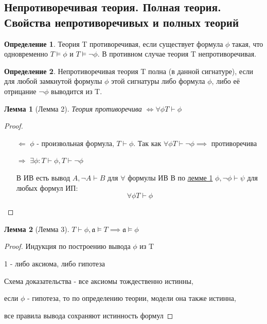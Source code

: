 \documentclass[a4paper]{article}
\newtheorem{lemma}{Лемма}[section]
\theoremstyle{definition}
\newtheorem*{definition}{Определение}
\theoremstyle{remark}
\begin{document}
    \subsection{Непротиворечивая теория. Полная теория. Свойства непротиворечивых и полных теорий}
    \begin{definition}
        Теория T противоречивая, если существует формула $\phi$ такая, что одновременно 
    $T \models \phi$ и $T \models \neg\phi$. В противном случае теория T непротиворечивая.
    \end{definition}
    \begin{definition}
        Непротиворечивая теория T полна (в данной сигнатуре), если для любой замкнутой формулы 
        $\phi$ этой сигнатуры либо формула $\phi$, либо её отрицание ¬$\phi$ выводится из T.
    \end{definition}
    \begin{lemma}[\hypertarget{Лемма 2}{Лемма 2}]
        Теория противоречива $\Leftrightarrow \forall \phi T\vdash \phi$
    \end{lemma}
    \begin{proof}
        \begin{itemize}
            \item[$\Leftarrow$] $\phi$ - произвольная формула, $T\vdash \phi$. Так как $\forall \phi T\vdash \neg \phi\implies$ противоречива
            \item[$\Rightarrow$] $\exists \phi: T\vdash\phi, T\vdash \neg \phi$
            
            В ИВ есть вывод $A, \neg A \vdash B$ для $\forall$ формулы ИВ В по \hyperlink{Лемма 1}{лемме 1} $\phi, \neg \phi \vdash \psi$ для любых формул ИП:
            $$\forall \phi T\vdash \phi$$
        \end{itemize}
    \end{proof}
    \begin{lemma}[\hypertarget{Лемма 3}{Лемма 3}]
        $T\vdash \phi, \mathfrak{a}\models T \implies \mathfrak{a}\models \phi$
    \end{lemma}
    \begin{proof}
        Индукция по построению вывода $\phi$ из T

        1 - либо аксиома, либо гипотеза

        Схема доказательства - все аксиомы тождественно истинны,
        
        если $\phi$ - гипотеза, то по определению теории, модели она также истинна,

        все правила вывода сохраняют истинность формул
    \end{proof}
\end{document}
